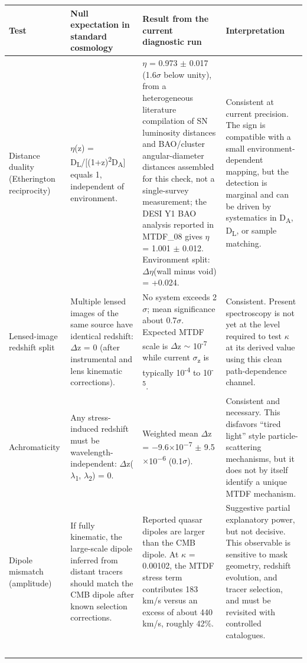 \documentclass[11pt,a4paper]{article}
\begin{document}
\begin{table}[H]
\centering
\footnotesize
\begin{tabularx}{\linewidth}{l>{\RaggedRight\arraybackslash}X>{\RaggedRight\arraybackslash}X>{\RaggedRight\arraybackslash}X}
\toprule
\textbf{Test} & \textbf{Null expectation in standard cosmology} & \textbf{Result from the current diagnostic run} & \textbf{Interpretation} \tabularnewline
\midrule
Distance duality (Etherington reciprocity) & $\eta$(z) = D\textsubscript{L}/[(1+z)\textsuperscript{2}D\textsubscript{A}] equals 1, independent of environment. & $\eta$ = 0.973 $\pm$ 0.017 (1.6$\sigma$ below unity), from a heterogeneous literature compilation of SN luminosity distances and BAO/\allowbreak{}cluster angular-diameter distances assembled for this check, not a single-survey measurement; the DESI Y1 BAO analysis reported in MTDF\_\allowbreak{}08 gives $\eta$ = 1.001 $\pm$ 0.012. Environment split: $\Delta$$\eta$(wall minus void) = +0.024. & Consistent at current precision. The sign is compatible with a small environment-dependent mapping, but the detection is marginal and can be driven by systematics in D\textsubscript{A}, D\textsubscript{L}, or sample matching. \tabularnewline
Lensed-image redshift split & Multiple lensed images of the same source have identical redshift: $\Delta$z = 0 (after instrumental and lens kinematic corrections). & No system exceeds 2$\sigma$; mean significance about 0.7$\sigma$. Expected MTDF scale is $\Delta$z  $\sim$ 10\textsuperscript{-7} while current $\sigma$\textsubscript{z} is typically 10\textsuperscript{-4} to 10\textsuperscript{-5}. & Consistent. Present spectroscopy is not yet at the level required to test $\kappa$ at its derived value using this clean path-dependence channel. \tabularnewline
Achromaticity & Any stress-induced redshift must be wavelength-independent: $\Delta$z($\lambda$\textsubscript{1}, $\lambda$\textsubscript{2}) = 0. & Weighted mean $\Delta$z = $-$9.6$\times$10\textsuperscript{$-$7} $\pm$ 9.5$\times$10\textsuperscript{$-$6} (0.1$\sigma$). & Consistent and necessary. This disfavors ``tired light'' style particle-scattering mechanisms, but it does not by itself identify a unique MTDF mechanism. \tabularnewline
Dipole mismatch (amplitude) & If fully kinematic, the large-scale dipole inferred from distant tracers should match the CMB dipole after known selection corrections. & Reported quasar dipoles are larger than the CMB dipole. At $\kappa$ = 0.00102, the MTDF stress term contributes 183 km/\allowbreak{}s versus an excess of about 440 km/\allowbreak{}s, roughly 42\%. & Suggestive partial explanatory power, but not decisive. This observable is sensitive to mask geometry, redshift evolution, and tracer selection, and must be revisited with controlled catalogues. \tabularnewline
$$
\end{tabularx}
\end{table}
\end{document}
